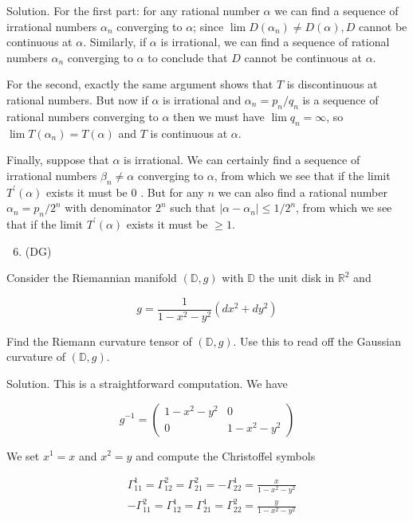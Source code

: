 \documentclass[10pt]{article}
\begin{document}
Solution. For the first part: for any rational number $\alpha$ we can find a sequence of irrational numbers $\alpha_{n}$ converging to $\alpha$; since $\lim D\left(\alpha_{n}\right) \neq D(\alpha), D$ cannot be continuous at $\alpha$. Similarly, if $\alpha$ is irrational, we can find a sequence of rational numbers $\alpha_{n}$ converging to $\alpha$ to conclude that $D$ cannot be continuous at $\alpha$.

For the second, exactly the same argument shows that $T$ is discontinuous at rational numbers. But now if $\alpha$ is irrational and $\alpha_{n}=p_{n} / q_{n}$ is a sequence of rational numbers converging to $\alpha$ then we must have $\lim q_{n}=\infty$, so $\lim T\left(\alpha_{n}\right)=T(\alpha)$ and $T$ is continuous at $\alpha$.

Finally, suppose that $\alpha$ is irrational. We can certainly find a sequence of irrational numbers $\beta_{n} \neq \alpha$ converging to $\alpha$, from which we see that if the limit $T^{\prime}(\alpha)$ exists it must be 0 . But for any $n$ we can also find a rational number $\alpha_{n}=p_{n} / 2^{n}$ with denominator $2^{n}$ such that $\left|\alpha-\alpha_{n}\right| \leq 1 / 2^{n}$, from which we see that if the limit $T^{\prime}(\alpha)$ exists it must be $\geq 1$.

\begin{enumerate}
  \setcounter{enumi}{5}
  \item (DG)
\end{enumerate}

Consider the Riemannian manifold $(\mathbb{D}, g)$ with $\mathbb{D}$ the unit disk in $\mathbb{R}^{2}$ and

$$
g=\frac{1}{1-x^{2}-y^{2}}\left(d x^{2}+d y^{2}\right)
$$

Find the Riemann curvature tensor of $(\mathbb{D}, g)$. Use this to read off the Gaussian curvature of $(\mathbb{D}, g)$.

Solution. This is a straightforward computation. We have

$$
g^{-1}=\left(\begin{array}{cc}
1-x^{2}-y^{2} & 0 \\
0 & 1-x^{2}-y^{2}
\end{array}\right)
$$

We set $x^{1}=x$ and $x^{2}=y$ and compute the Christoffel symbols

$$
\begin{aligned}
& \Gamma_{11}^{1}=\Gamma_{12}^{2}=\Gamma_{21}^{2}=-\Gamma_{22}^{1}=\frac{x}{1-x^{2}-y^{2}} \\
& -\Gamma_{11}^{2}=\Gamma_{12}^{1}=\Gamma_{21}^{1}=\Gamma_{22}^{2}=\frac{y}{1-x^{2}-y^{2}}
\end{aligned}
$$
\end{document}
